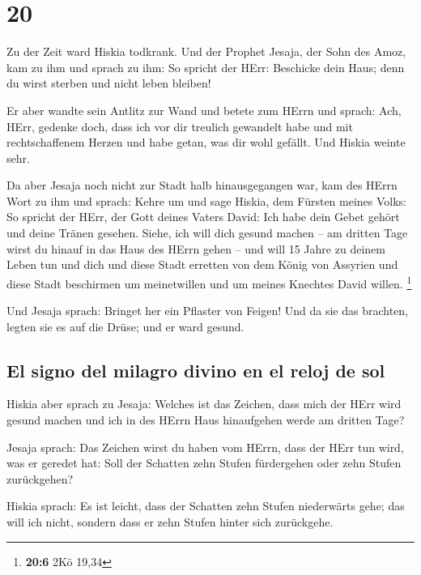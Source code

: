\hypertarget{section-19}{%
\section{20}\label{section-19}}

 Zu der Zeit ward Hiskia todkrank. Und der Prophet Jesaja,
der Sohn des Amoz, kam zu ihm und sprach zu ihm: So spricht der HErr:
Beschicke dein Haus; denn du wirst sterben und nicht leben bleiben!

 Er aber wandte sein Antlitz zur Wand und betete zum HErrn
und sprach:  Ach, HErr, gedenke doch, dass ich vor dir
treulich gewandelt habe und mit rechtschaffenem Herzen und habe getan,
was dir wohl gefällt. Und Hiskia weinte sehr.

 Da aber Jesaja noch nicht zur Stadt halb hinausgegangen
war, kam des HErrn Wort zu ihm und sprach:  Kehre um und
sage Hiskia, dem Fürsten meines Volks: So spricht der HErr, der Gott
deines Vaters David: Ich habe dein Gebet gehört und deine Tränen
gesehen. Siehe, ich will dich gesund machen -- am dritten Tage wirst du
hinauf in das Haus des HErrn gehen --  und will 15 Jahre
zu deinem Leben tun und dich und diese Stadt erretten von dem König von
Assyrien und diese Stadt beschirmen um meinetwillen und um meines
Knechtes David willen. \footnote{\textbf{20:6} 2Kö 19,34}

 Und Jesaja sprach: Bringet her ein Pflaster von Feigen!
Und da sie das brachten, legten sie es auf die Drüse; und er ward
gesund.

\hypertarget{el-signo-del-milagro-divino-en-el-reloj-de-sol}{%
\subsection{El signo del milagro divino en el reloj de
sol}\label{el-signo-del-milagro-divino-en-el-reloj-de-sol}}

 Hiskia aber sprach zu Jesaja: Welches ist das Zeichen,
dass mich der HErr wird gesund machen und ich in des HErrn Haus
hinaufgehen werde am dritten Tage?

 Jesaja sprach: Das Zeichen wirst du haben vom HErrn, dass
der HErr tun wird, was er geredet hat: Soll der Schatten zehn Stufen
fürdergehen oder zehn Stufen zurückgehen?

 Hiskia sprach: Es ist leicht, dass der Schatten zehn
Stufen niederwärts gehe; das will ich nicht, sondern dass er zehn Stufen
hinter sich zurückgehe.

